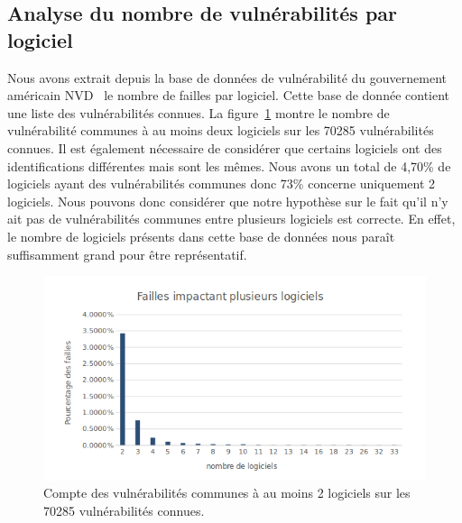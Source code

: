 \subsection{Analyse du nombre de vulnérabilités par logiciel}
Nous avons extrait depuis la base de données de vulnérabilité du gouvernement américain NVD~\cite{vulnDatabase} le nombre de failles par logiciel.
Cette base de donnée contient une liste des vulnérabilités connues.
La figure~\ref{fig:vulPerLog} montre le nombre de vulnérabilité communes à au moins deux logiciels sur les 70285 vulnérabilités connues.
Il est également nécessaire de considérer que certains logiciels ont des identifications différentes mais sont les mêmes.
Nous avons un total de 4,70\% de logiciels ayant des vulnérabilités communes donc 73\% concerne uniquement 2 logiciels.
Nous pouvons donc considérer que notre hypothèse sur le fait qu'il n'y ait pas de vulnérabilités communes entre plusieurs
logiciels est correcte. En effet, le nombre de logiciels présents dans cette base de données nous paraît suffisamment grand pour
être représentatif.

\begin{figure}
\includegraphics[width=\linewidth]{data/commonVuln.png}
\caption{Compte des vulnérabilités communes à au moins 2 logiciels sur les 70285 vulnérabilités connues.}
\label{fig:vulPerLog}
\end{figure}

